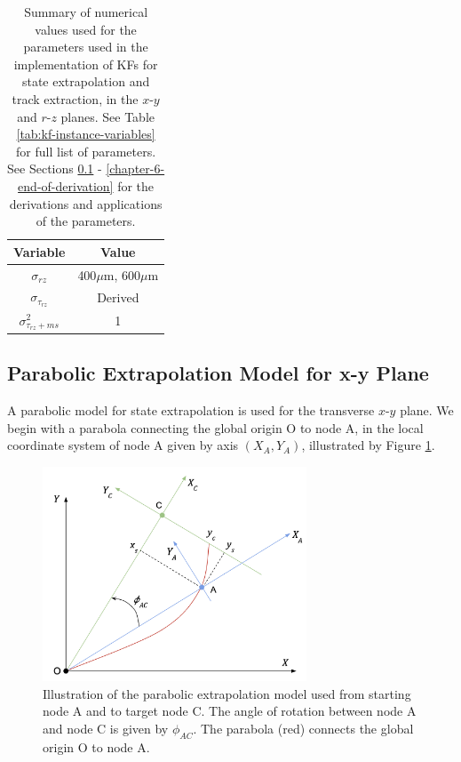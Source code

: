 \begin{table}[!htbp]
\caption{Summary of numerical values used for the parameters used in the implementation of KFs for state extrapolation and track extraction, in the $x$-$y$ and $r$-$z$ planes. See Table \ref{tab:kf-instance-variables} for full list of parameters. See Sections \ref{chapter-6-start-of-derivation} - \ref{chapter-6-end-of-derivation} for the derivations and applications of the parameters.}
\begin{center}
\begin{tabular}{cc}
\toprule
Variable & Value \\
\hline

$\sigma_{rz}$           &   400$\mu$m, 600$\mu$m    \\
$\sigma_{\tau_{rz}}$    &       Derived     \\
$\sigma_{\tau_{rz} + ms}^2$     &   1     \\
\bottomrule
\end{tabular}
\end{center}
\label{tab:kf-instance-variables-values}
\end{table}











\subsection{Parabolic Extrapolation Model for x-y Plane}
\label{chapter-6-start-of-derivation}

A parabolic model for state extrapolation is used for the transverse $x$-$y$ plane. We begin with a parabola connecting the global origin O to node A, in the local coordinate system of node A given by axis $(X_A, Y_A)$, illustrated by Figure \ref{fig:trackml-parabolic-extrapolation-model-xy}.

\begin{figure}[htbp]
    \centering
    \includegraphics[width=0.7\textwidth]{images/6-trackml/extrapolation-model-xy-trackml-2.png}
    \caption{Illustration of the parabolic extrapolation model used from starting node A and to target node C. The angle of rotation between node A and node C is given by $\phi_{AC}$. The parabola (red) connects the global origin O to node A.}
    \label{fig:trackml-parabolic-extrapolation-model-xy}%
\end{figure}

